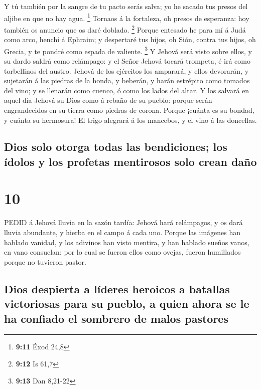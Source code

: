  Y tú también por la sangre de tu pacto serás salva; yo he
sacado tus presos del aljibe en que no hay agua. \footnote{\textbf{9:11}
  Éxod 24,8}  Tornaos á la fortaleza, oh presos de
esperanza: hoy también os anuncio que os daré doblado. \footnote{\textbf{9:12}
  Is 61,7}  Porque entesado he para mí á Judá como arco,
henchí á Ephraim; y despertaré tus hijos, oh Sión, contra tus hijos, oh
Grecia, y te pondré como espada de valiente. \footnote{\textbf{9:13} Dan
  8,21-22}  Y Jehová será visto sobre ellos, y su dardo
saldrá como relámpago: y el Señor Jehová tocará trompeta, é irá como
torbellinos del austro.  Jehová de los ejércitos los
amparará, y ellos devorarán, y sujetarán á las piedras de la honda, y
beberán, y harán estrépito como tomados del vino; y se llenarán como
cuenco, ó como los lados del altar.  Y los salvará en aquel
día Jehová su Dios como á rebaño de su pueblo: porque serán
engrandecidos en su tierra como piedras de corona.  Porque
¡cuánta es su bondad, y cuánta su hermosura! El trigo alegrará á los
mancebos, y el vino á las doncellas.

\hypertarget{dios-solo-otorga-todas-las-bendiciones-los-uxeddolos-y-los-profetas-mentirosos-solo-crean-dauxf1o}{%
\subsection{Dios solo otorga todas las bendiciones; los ídolos y los
profetas mentirosos solo crean
daño}\label{dios-solo-otorga-todas-las-bendiciones-los-uxeddolos-y-los-profetas-mentirosos-solo-crean-dauxf1o}}

\hypertarget{section-9}{%
\section{10}\label{section-9}}

 PEDID á Jehová lluvia en la sazón tardía: Jehová hará
relámpagos, y os dará lluvia abundante, y hierba en el campo á cada uno.
 Porque las imágenes han hablado vanidad, y los adivinos han
visto mentira, y han hablado sueños vanos, en vano consuelan: por lo
cual se fueron ellos como ovejas, fueron humillados porque no tuvieron
pastor.

\hypertarget{dios-despierta-a-luxedderes-heroicos-a-batallas-victoriosas-para-su-pueblo-a-quien-ahora-se-le-ha-confiado-el-sombrero-de-malos-pastores}{%
\subsection{Dios despierta a líderes heroicos a batallas victoriosas
para su pueblo, a quien ahora se le ha confiado el sombrero de malos
pastores}\label{dios-despierta-a-luxedderes-heroicos-a-batallas-victoriosas-para-su-pueblo-a-quien-ahora-se-le-ha-confiado-el-sombrero-de-malos-pastores}}


